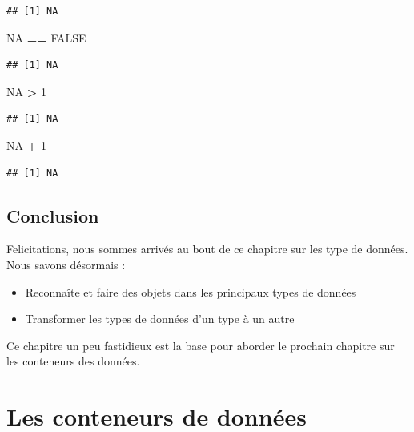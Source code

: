 \documentclass[]{book}
\newenvironment{Shaded}{\begin{snugshade}}{\end{snugshade}}
\newcommand{\DecValTok}[1]{\textcolor[rgb]{0.00,0.00,0.81}{#1}}
\newcommand{\OperatorTok}[1]{\textcolor[rgb]{0.81,0.36,0.00}{\textbf{#1}}}
\newcommand{\OtherTok}[1]{\textcolor[rgb]{0.56,0.35,0.01}{#1}}
\newcommand{\StringTok}[1]{\textcolor[rgb]{0.31,0.60,0.02}{#1}}
\providecommand{\tightlist}{%
  \setlength{\itemsep}{0pt}\setlength{\parskip}{0pt}}
\begin{document}
\begin{verbatim}
## [1] NA
\end{verbatim}

\begin{Shaded}
\begin{Highlighting}[]
\OtherTok{NA} \OperatorTok{==}\StringTok{ }\OtherTok{FALSE}
\end{Highlighting}
\end{Shaded}

\begin{verbatim}
## [1] NA
\end{verbatim}

\begin{Shaded}
\begin{Highlighting}[]
\OtherTok{NA} \OperatorTok{>}\StringTok{ }\DecValTok{1}
\end{Highlighting}
\end{Shaded}

\begin{verbatim}
## [1] NA
\end{verbatim}

\begin{Shaded}
\begin{Highlighting}[]
\OtherTok{NA} \OperatorTok{+}\StringTok{ }\DecValTok{1}
\end{Highlighting}
\end{Shaded}

\begin{verbatim}
## [1] NA
\end{verbatim}

\hypertarget{conclusion-2}{%
\section{Conclusion}\label{conclusion-2}}

Felicitations, nous sommes arrivés au bout de ce chapitre sur les type de données. Nous savons désormais :

\begin{itemize}
\tightlist
\item
  Reconnaîte et faire des objets dans les principaux types de données
\item
  Transformer les types de données d'un type à un autre
\end{itemize}

Ce chapitre un peu fastidieux est la base pour aborder le prochain chapitre sur les conteneurs des données.

\hypertarget{dataType2}{%
\chapter{Les conteneurs de données}\label{dataType2}}
\end{document}
